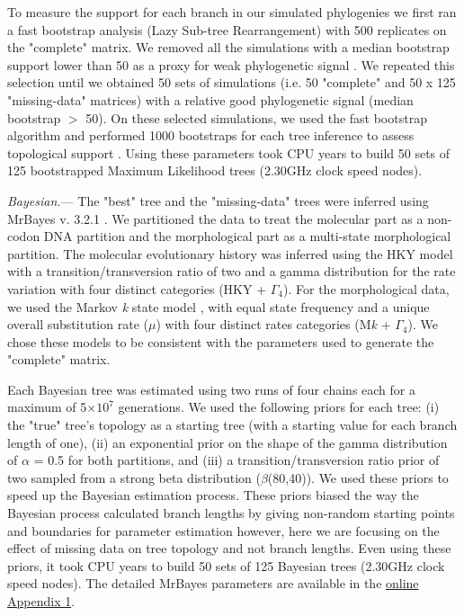 \documentclass[12pt,letterpaper]{article}
\renewcommand{\subsubsection}[1]{%
\vspace{2ex}
\noindent
\textit{#1.}---}
\begin{document}
To measure the support for each branch in our simulated phylogenies we first ran a fast bootstrap analysis (Lazy Sub-tree Rearrangement) with 500 replicates on the "complete" matrix. We removed all the simulations with a median bootstrap support lower than 50 as a proxy for weak phylogenetic signal \citep{zanderminimal2004}. We repeated this selection until we obtained 50 sets of simulations (i.e. 50 "complete" and 50 x 125 "missing-data" matrices) with a relative good phylogenetic signal (median bootstrap $>$ 50). On these selected simulations, we used the fast bootstrap algorithm and performed 1000 bootstraps for each tree inference to assess topological support \citep{pattengale2010many}. Using these parameters took  CPU years to build 50 sets of 125 bootstrapped Maximum Likelihood trees (2.30GHz clock speed nodes).

\subsubsection{Bayesian}
The "best" tree and the "missing-data" trees were inferred using MrBayes v. 3.2.1 \citep{Ronquist2012mrbayes}. We partitioned the data to treat the molecular part as a non-codon DNA partition and the morphological part as a multi-state morphological partition. The molecular evolutionary history was inferred using the HKY model with a transition/transversion ratio of two \citep{douadycomparison2003} and a gamma distribution for the rate variation with four distinct categories (HKY + $\Gamma_4$). For the morphological data, we used the Markov \textit{k} state model \citep{lewisa2001}, with equal state frequency and a unique overall substitution rate ($\mu$) with four distinct rates categories (M\textit{k} + $\Gamma_4$). We chose these models to be consistent with the parameters used to generate the "complete" matrix.

Each Bayesian tree was estimated using two runs of four chains each for a maximum of 5$\times$$10^7$ generations. We used the following priors for each tree: (i) the "true" tree’s topology as a starting tree (with a starting value for each branch length of one), (ii) an exponential prior on the shape of the gamma distribution of $\alpha$ = 0.5 for both partitions, and (iii) a transition/transversion ratio prior of two sampled from a strong beta distribution ($\beta$(80,40)). We used these priors to speed up the Bayesian estimation process. These priors biased the way the Bayesian process calculated branch lengths by giving non-random starting points and boundaries for parameter estimation however, here we are focusing on the effect of missing data on tree topology and not branch lengths. Even using these priors, it took  CPU years to build 50 sets of 125 Bayesian trees (2.30GHz clock speed nodes). The detailed MrBayes parameters are available in the \hyperref[SupplementaryMaterial]{online Appendix 1}.
\end{document}
